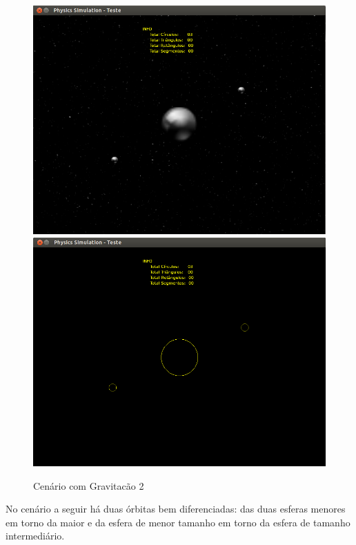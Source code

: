 \begin{figure}[H]
	\centering
	\includegraphics[scale=0.2]{images/cenario-gravitacao-4.png}
	\includegraphics[scale=0.2]{images/cenario-gravitacao-3.png}
	\caption{Cenário com Gravitacão 2}
\end{figure}

No cenário a seguir há duas órbitas bem diferenciadas: das duas esferas menores em torno da maior e da esfera de menor tamanho em torno da esfera de tamanho intermediário.

